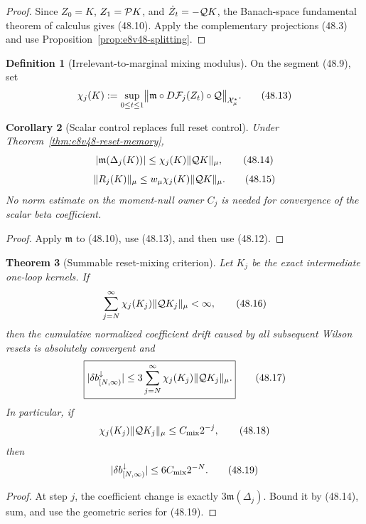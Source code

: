 \documentclass[11pt,oneside]{book}
\newtheorem{theorem}{Theorem}[chapter]
\newtheorem{corollary}[theorem]{Corollary}
\theoremstyle{definition}
\newtheorem{definition}[theorem]{Definition}
\theoremstyle{remark}
\begin{document}
\begin{proof}
Since \(Z_0=K\), \(Z_1={\cal P}K\), and
\(\dot Z_t=-{\cal Q}K\), the Banach-space fundamental theorem of
calculus gives (48.10).  Apply the complementary projections
(48.3) and use Proposition~\ref{prop:e8v48-splitting}.
\end{proof}

\begin{definition}[Irrelevant-to-marginal mixing modulus]
\label{def:e8v48-mixing-modulus}
On the segment (48.9), set
\[
 \chi_j(K)
 :=\sup_{0\le t\le1}
 \bigl\|{\mathfrak m}\circ D{\cal F}_j(Z_t)\circ{\cal Q}
 \bigr\|_{{\cal X}_\mu^*}.                                   \tag{48.13}
\]
\end{definition}

\begin{corollary}[Scalar control replaces full reset control]
\label{cor:e8v48-scalar-control}
Under Theorem~\ref{thm:e8v48-reset-memory},
\[
 |{\mathfrak m}(\Delta_j(K))|
 \le\chi_j(K)\|{\cal Q}K\|_\mu,                               \tag{48.14}
\]
\[
 \|R_j(K)\|_\mu
 \le w_\mu\chi_j(K)\|{\cal Q}K\|_\mu.                         \tag{48.15}
\]
No norm estimate on the moment-null owner \(C_j\) is needed for
convergence of the scalar beta coefficient.
\end{corollary}

\begin{proof}
Apply \(\mathfrak m\) to (48.10), use (48.13), and then use
(48.12).
\end{proof}

\begin{theorem}[Summable reset-mixing criterion]
\label{thm:e8v48-summable-mixing}
Let \(K_j\) be the exact intermediate one-loop kernels.  If
\[
 \sum_{j=N}^\infty
 \chi_j(K_j)\|{\cal Q}K_j\|_\mu<\infty,                       \tag{48.16}
\]
then the cumulative normalized coefficient drift caused by all
subsequent Wilson resets is absolutely convergent and
\[
 \boxed{
 |\delta b^\downarrow_{[N,\infty)}|
 \le3\sum_{j=N}^\infty
 \chi_j(K_j)\|{\cal Q}K_j\|_\mu.}                             \tag{48.17}
\]
In particular, if
\[
 \chi_j(K_j)\|{\cal Q}K_j\|_\mu\le C_{\rm mix}2^{-j},          \tag{48.18}
\]
then
\[
 |\delta b^\downarrow_{[N,\infty)}|
 \le6C_{\rm mix}2^{-N}.                                      \tag{48.19}
\]
\end{theorem}

\begin{proof}
At step \(j\), the coefficient change is exactly
\(3{\mathfrak m}(\Delta_j)\).  Bound it by (48.14), sum, and use
the geometric series for (48.19).
\end{proof}
\end{document}
